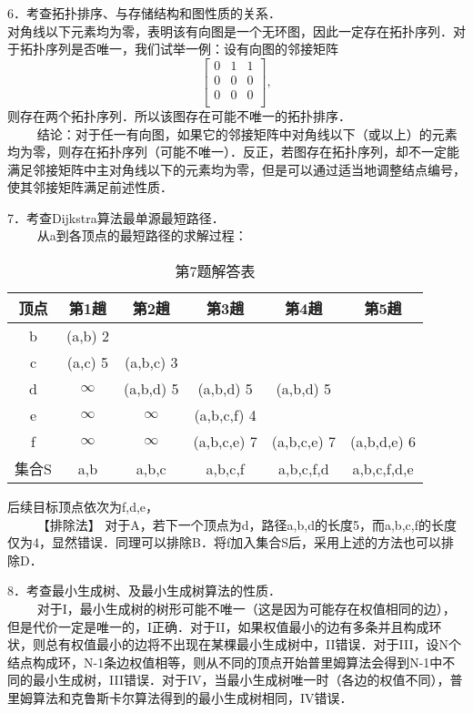 6．考查拓扑排序、与存储结构和图性质的关系．\\
对角线以下元素均为零，表明该有向图是一个无环图，因此一定存在拓扑序列．对于拓扑序列是否唯一，我们试举一例：设有向图的邻接矩阵
\begin{equation}
\begin{bmatrix}
 0 & 1 & 1 \\
 0 & 0 & 0 \\
 0 & 0 & 0 \\
\end{bmatrix},
\end{equation}
则存在两个拓扑序列．所以该图存在可能不唯一的拓扑排序．\\
$\qquad$ 结论：对于任一有向图，如果它的邻接矩阵中对角线以下（或以上）的元素均为零，则存在拓扑序列（可能不唯一）．反正，若图存在拓扑序列，却不一定能满足邻接矩阵中主对角线以下的元素均为零，但是可以通过适当地调整结点编号，使其邻接矩阵满足前述性质．

7．考查Dijkstra算法最单源最短路径．\\
$\qquad$ 从a到各顶点的最短路径的求解过程：\\
\begin{table}[ht]
\centering
\caption{第7题解答表}\label{CSN12_tab5}
\begin{tabular}{|c|c|c|c|c|c|}
\hline
顶点 & 第1趟 & 第2趟 & 第3趟 & 第4趟 & 第5趟 \\
\hline
b & (a,b) 2 &  &  &  &  \\
\hline
c & (a,c) 5 & (a,b,c) 3 &  &  &  \\
\hline
d & $\infty$ & (a,b,d) 5 & (a,b,d) 5 & (a,b,d) 5 &  \\
\hline
e & $\infty$ & $\infty$ & (a,b,c,f) 4 &  &  \\
\hline
f & $\infty$  & $\infty$ & (a,b,c,e) 7 & (a,b,c,e) 7 & (a,b,d,e) 6 \\
\hline
集合S & {a,b} & {a,b,c} & {a,b,c,f} & {a,b,c,f,d} & {a,b,c,f,d,e} \\
\hline
\end{tabular}
\end{table}
后续目标顶点依次为f,d,e， \\
$\qquad$ 【排除法】 对于A，若下一个顶点为d，路径a,b,d的长度5，而a,b,c,f的长度仅为4，显然错误．同理可以排除B．将f加入集合S后，采用上述的方法也可以排除D．

8．考查最小生成树、及最小生成树算法的性质．\\
$\qquad$ 对于I，最小生成树的树形可能不唯一（这是因为可能存在权值相同的边），但是代价一定是唯一的，I正确．对于II，如果权值最小的边有多条并且构成环状，则总有权值最小的边将不出现在某棵最小生成树中，II错误．对于III，设N个结点构成环，N-1条边权值相等，则从不同的顶点开始普里姆算法会得到N-1中不同的最小生成树，III错误．对于IV，当最小生成树唯一时（各边的权值不同），普里姆算法和克鲁斯卡尔算法得到的最小生成树相同，IV错误．


